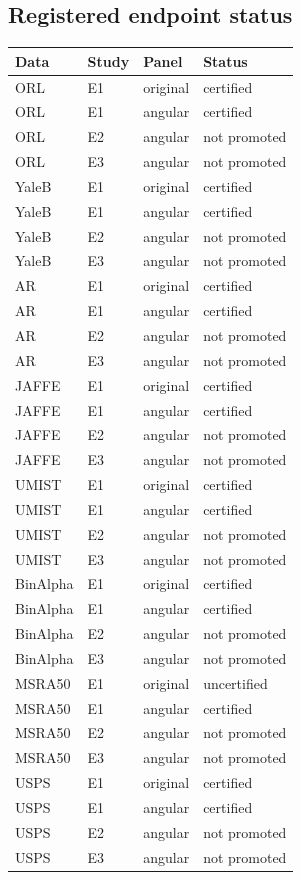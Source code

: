 \subsection{Registered endpoint status}
\begin{longtable}{llp{.28\linewidth}p{.30\linewidth}}\toprule Data & Study & Panel & Status\\\midrule\endhead
ORL & E1 & original & certified\\
ORL & E1 & angular & certified\\
ORL & E2 & angular & not promoted\\
ORL & E3 & angular & not promoted\\
YaleB & E1 & original & certified\\
YaleB & E1 & angular & certified\\
YaleB & E2 & angular & not promoted\\
YaleB & E3 & angular & not promoted\\
AR & E1 & original & certified\\
AR & E1 & angular & certified\\
AR & E2 & angular & not promoted\\
AR & E3 & angular & not promoted\\
JAFFE & E1 & original & certified\\
JAFFE & E1 & angular & certified\\
JAFFE & E2 & angular & not promoted\\
JAFFE & E3 & angular & not promoted\\
UMIST & E1 & original & certified\\
UMIST & E1 & angular & certified\\
UMIST & E2 & angular & not promoted\\
UMIST & E3 & angular & not promoted\\
BinAlpha & E1 & original & certified\\
BinAlpha & E1 & angular & certified\\
BinAlpha & E2 & angular & not promoted\\
BinAlpha & E3 & angular & not promoted\\
MSRA50 & E1 & original & uncertified\\
MSRA50 & E1 & angular & certified\\
MSRA50 & E2 & angular & not promoted\\
MSRA50 & E3 & angular & not promoted\\
USPS & E1 & original & certified\\
USPS & E1 & angular & certified\\
USPS & E2 & angular & not promoted\\
USPS & E3 & angular & not promoted\\
\bottomrule\end{longtable}
